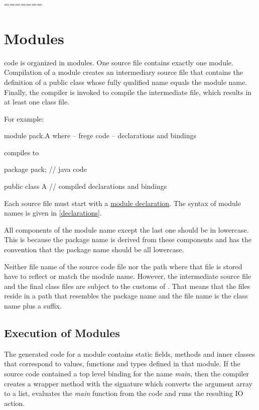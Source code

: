 =======


\chapter{Modules} \label{modules} 

\frege{} code is organized in modules. One source file contains
exactly one module. Compilation of a module creates an  intermediary \java{}
source file that contains the definition of a public class whose fully qualified name equals the \frege{} module name. Finally, the \java{} compiler is invoked to compile the intermediate file, which results in at least one class file.

For example:

\begin{code}
module pack.A where  -- frege code
-- declarations and bindings
\end{code}

compiles to

\begin{code}
package pack;        // java code

public class A {
    // compiled declarations and bindings
}
\end{code}


Each source file must start with a \hyperref[moduledcl]{module declaration}.
The syntax of module names is given in \autoref{declarations}.

All components of the module name
except the last one should be in lowercase. This is because the \java{}
package name is derived from these components and \java{} has the
convention that the package name should be all lowercase.

Neither file name of the \frege{} source code file nor the path where that file is stored have to reflect or match the module name. However, the intermediate \java{} source file and the final class files are subject to the customs of \java{}. That means that the files reside in a path that resembles the package name and the file name is the class name plus a suffix.

\section{Execution of \frege{} Modules} \label{execution}

The generated \java{} code for a \frege{} module contains static fields, methods and inner classes that correspond to \frege{} values, functions and types defined in that module. If the source code contained a top level binding for the name \emph{main}, then the compiler creates a wrapper method with the signature 
which converts the argument array to a list, evaluates the \emph{main} function from the \frege{} code and runs the resulting IO action. 

